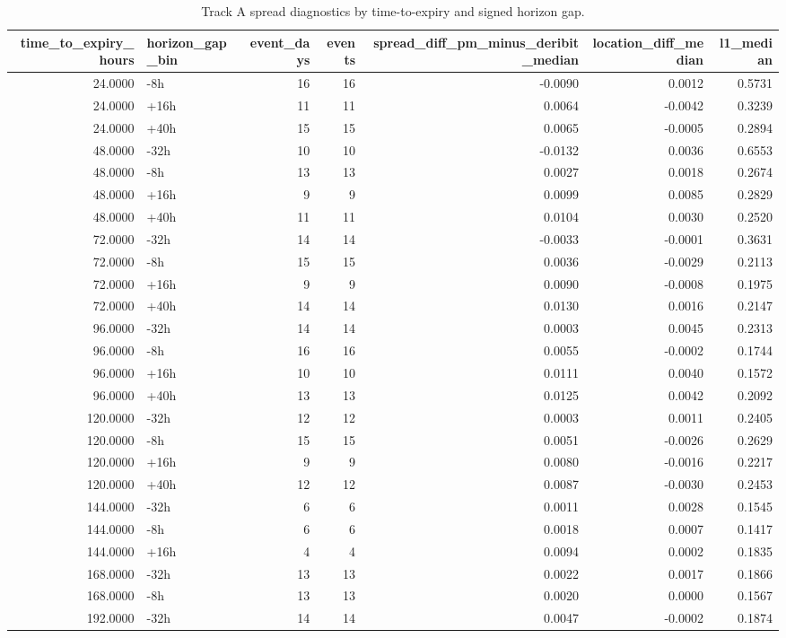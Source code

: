 \begin{table}
\caption{Track A spread diagnostics by time-to-expiry and signed horizon gap.}
\label{tab:trackA_moments_by_tte_gap}
\begin{tabular}{rlrrrrr}
\toprule
time\_to\_expiry\_hours & horizon\_gap\_bin & event\_days & events & spread\_diff\_pm\_minus\_deribit\_median & location\_diff\_median & l1\_median \\
\midrule
24.0000 & -8h & 16 & 16 & -0.0090 & 0.0012 & 0.5731 \\
24.0000 & +16h & 11 & 11 & 0.0064 & -0.0042 & 0.3239 \\
24.0000 & +40h & 15 & 15 & 0.0065 & -0.0005 & 0.2894 \\
48.0000 & -32h & 10 & 10 & -0.0132 & 0.0036 & 0.6553 \\
48.0000 & -8h & 13 & 13 & 0.0027 & 0.0018 & 0.2674 \\
48.0000 & +16h & 9 & 9 & 0.0099 & 0.0085 & 0.2829 \\
48.0000 & +40h & 11 & 11 & 0.0104 & 0.0030 & 0.2520 \\
72.0000 & -32h & 14 & 14 & -0.0033 & -0.0001 & 0.3631 \\
72.0000 & -8h & 15 & 15 & 0.0036 & -0.0029 & 0.2113 \\
72.0000 & +16h & 9 & 9 & 0.0090 & -0.0008 & 0.1975 \\
72.0000 & +40h & 14 & 14 & 0.0130 & 0.0016 & 0.2147 \\
96.0000 & -32h & 14 & 14 & 0.0003 & 0.0045 & 0.2313 \\
96.0000 & -8h & 16 & 16 & 0.0055 & -0.0002 & 0.1744 \\
96.0000 & +16h & 10 & 10 & 0.0111 & 0.0040 & 0.1572 \\
96.0000 & +40h & 13 & 13 & 0.0125 & 0.0042 & 0.2092 \\
120.0000 & -32h & 12 & 12 & 0.0003 & 0.0011 & 0.2405 \\
120.0000 & -8h & 15 & 15 & 0.0051 & -0.0026 & 0.2629 \\
120.0000 & +16h & 9 & 9 & 0.0080 & -0.0016 & 0.2217 \\
120.0000 & +40h & 12 & 12 & 0.0087 & -0.0030 & 0.2453 \\
144.0000 & -32h & 6 & 6 & 0.0011 & 0.0028 & 0.1545 \\
144.0000 & -8h & 6 & 6 & 0.0018 & 0.0007 & 0.1417 \\
144.0000 & +16h & 4 & 4 & 0.0094 & 0.0002 & 0.1835 \\
168.0000 & -32h & 13 & 13 & 0.0022 & 0.0017 & 0.1866 \\
168.0000 & -8h & 13 & 13 & 0.0020 & 0.0000 & 0.1567 \\
192.0000 & -32h & 14 & 14 & 0.0047 & -0.0002 & 0.1874 \\
\bottomrule
\end{tabular}
\end{table}
